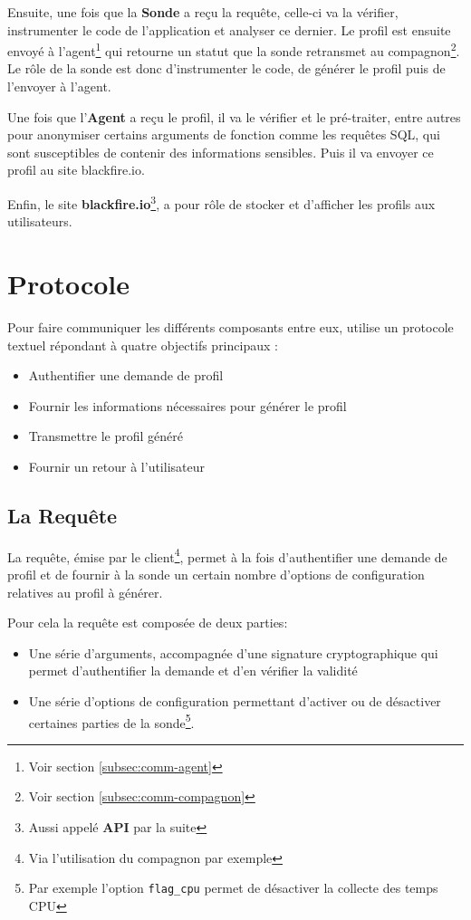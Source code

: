 Ensuite, une fois que la \textbf{Sonde} a reçu la requête, celle-ci va la vérifier, instrumenter le code de l'application et analyser ce dernier. Le profil est ensuite envoyé à l'agent\footnote{Voir section \vref{subsec:comm-agent}} qui retourne un statut que la sonde retransmet au compagnon\footnote{Voir section \vref{subsec:comm-compagnon}}. Le rôle de la sonde est donc d'instrumenter le code, de générer le profil puis de l'envoyer à l'agent.

Une fois que l'\textbf{Agent} a reçu le profil, il va le vérifier et le pré-traiter, entre autres pour anonymiser certains arguments de fonction comme les requêtes SQL, qui sont susceptibles de contenir des informations sensibles. Puis il va envoyer ce profil au site blackfire.io.

Enfin, le site \textbf{blackfire.io}\footnote{Aussi appelé \textbf{API} par la suite}, a pour rôle de stocker et d'afficher les profils aux utilisateurs.

		\section{Protocole}
			\label{sec:BlackfireProtocol}
Pour faire communiquer les différents composants entre eux, \Blackfire utilise un protocole textuel répondant à quatre objectifs principaux :
\begin{itemize}
\item Authentifier une demande de profil
\item Fournir les informations nécessaires pour générer le profil
\item Transmettre le profil généré
\item Fournir un retour à l'utilisateur
\end{itemize}

			\subsection{La Requête}
			\label{subsec:BlackfireQuery}
La requête, émise par le client\footnote{Via l'utilisation du compagnon par exemple}, permet à la fois d'authentifier une demande de profil et de fournir à la sonde un certain nombre d'options de configuration relatives au profil à générer.

Pour cela la requête est composée de deux parties:
\begin{itemize}
\item Une série d'arguments, accompagnée d'une signature cryptographique qui permet d'authentifier la demande et d'en vérifier la validité
\item Une série d'options de configuration permettant d'activer ou de désactiver certaines parties de la sonde\footnote{Par exemple l'option \verb?flag_cpu? permet de désactiver la collecte des temps CPU}.
\end{itemize}

